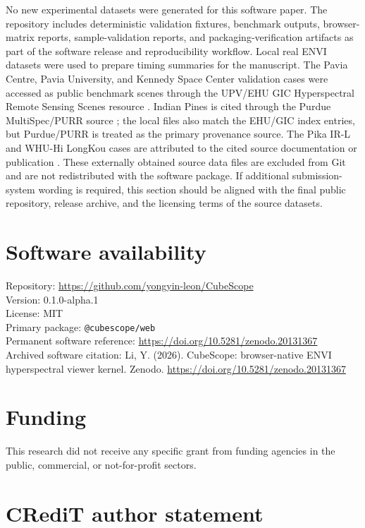 \documentclass[preprint,12pt,a4paper]{elsarticle}
\begin{document}
No new experimental datasets were generated for this software paper. The
repository includes deterministic validation fixtures, benchmark outputs,
browser-matrix reports, sample-validation reports, and packaging-verification
artifacts as part of the software release and reproducibility workflow. Local
real ENVI datasets were used to prepare timing summaries for the manuscript.
The Pavia Centre, Pavia University, and Kennedy Space Center validation cases
were accessed as public benchmark scenes through
the UPV/EHU GIC Hyperspectral Remote Sensing Scenes resource \cite{ehugic}.
Indian Pines is cited through the Purdue MultiSpec/PURR source
\cite{purdueindian}; the local files also match the EHU/GIC index entries, but
Purdue/PURR is treated as the primary provenance source. The Pika IR-L and
WHU-Hi LongKou cases are attributed to the cited source documentation or
publication \cite{resononpika,zhong2020}. These externally obtained source data
files are excluded from Git and are not redistributed with the software
package. If additional submission-system wording is required, this section
should be aligned with the final public repository, release archive, and the
licensing terms of the source datasets.

\section*{Software availability}

Repository: \url{https://github.com/yongyin-leon/CubeScope}\\
Version: 0.1.0-alpha.1\\
License: MIT\\
Primary package: \texttt{@cubescope/web}\\
Permanent software reference: \url{https://doi.org/10.5281/zenodo.20131367}\\
Archived software citation: Li, Y. (2026). CubeScope: browser-native ENVI
hyperspectral viewer kernel. Zenodo.
\url{https://doi.org/10.5281/zenodo.20131367}

\section*{Funding}

This research did not receive any specific grant from funding agencies in the
public, commercial, or not-for-profit sectors.

\section*{CRediT author statement}
\end{document}
